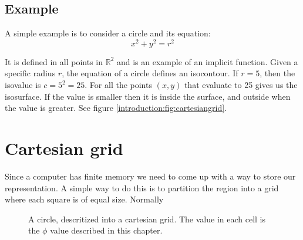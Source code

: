 
\subsection*{Example}

A simple example is to consider a circle and its equation:
\begin{equation*} 
  x^{2} + y^{2} = r^{2}
\end{equation*}

It is defined in all points in $\mathbb{R}^{2}$ and is an example of
an implicit function. Given a specific radius $r$, the equation of a
circle defines an isocontour. If $r = 5$, then the isovalue is $c =
5^{2} = 25$. For all the points $(x,y)$ that evaluate to 25 gives us
the isosurface. If the value is smaller then it is inside the surface,
and outside when the value is greater. See figure
\vref{introduction:fig:cartesiangrid}.



\section{Cartesian grid}

\begin{comment} Finite memory -> descritization of plane -> cartesian
grid is used.
\end{comment}

Since a computer has finite memory we need to come up with a way to
store our representation. A simple way to do this is to partition the region into a grid where each
square is of equal size. Normally

\begin{figure}[htb] \centering
  \caption{A circle, descritized into a cartesian grid. The value in
    each cell is the $\phi$ value described in this chapter.}
  \label{introduction:fig:cartesiangrid}
\end{figure}

